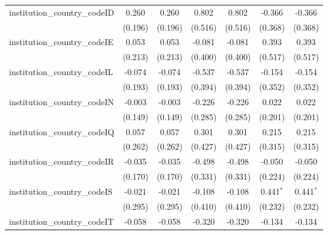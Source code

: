 \begin{tabular}{lcccccc}
   institution\_country\_codeID          & 0.260          & 0.260          & 0.802          & 0.802          & -0.366         & -0.366\\   
                                         & (0.196)        & (0.196)        & (0.516)        & (0.516)        & (0.368)        & (0.368)\\   
   institution\_country\_codeIE          & 0.053          & 0.053          & -0.081         & -0.081         & 0.393          & 0.393\\   
                                         & (0.213)        & (0.213)        & (0.400)        & (0.400)        & (0.517)        & (0.517)\\   
   institution\_country\_codeIL          & -0.074         & -0.074         & -0.537         & -0.537         & -0.154         & -0.154\\   
                                         & (0.193)        & (0.193)        & (0.394)        & (0.394)        & (0.352)        & (0.352)\\   
   institution\_country\_codeIN          & -0.003         & -0.003         & -0.226         & -0.226         & 0.022          & 0.022\\   
                                         & (0.149)        & (0.149)        & (0.285)        & (0.285)        & (0.201)        & (0.201)\\   
   institution\_country\_codeIQ          & 0.057          & 0.057          & 0.301          & 0.301          & 0.215          & 0.215\\   
                                         & (0.262)        & (0.262)        & (0.427)        & (0.427)        & (0.315)        & (0.315)\\   
   institution\_country\_codeIR          & -0.035         & -0.035         & -0.498         & -0.498         & -0.050         & -0.050\\   
                                         & (0.170)        & (0.170)        & (0.331)        & (0.331)        & (0.224)        & (0.224)\\   
   institution\_country\_codeIS          & -0.021         & -0.021         & -0.108         & -0.108         & 0.441$^{*}$    & 0.441$^{*}$\\   
                                         & (0.295)        & (0.295)        & (0.410)        & (0.410)        & (0.232)        & (0.232)\\   
   institution\_country\_codeIT          & -0.058         & -0.058         & -0.320         & -0.320         & -0.134         & -0.134\\   

\end{tabular}
